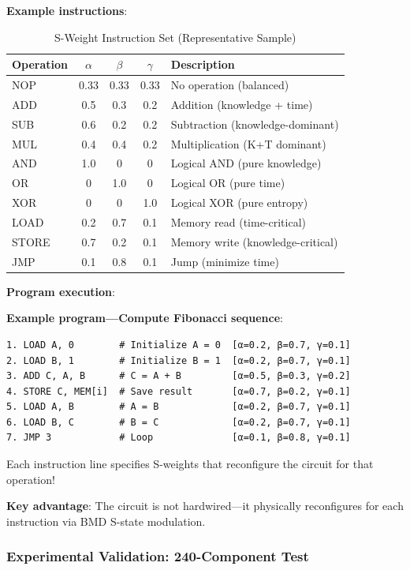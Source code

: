 \documentclass[11pt,a4paper]{article}
\begin{document}
\textbf{Example instructions}:

\begin{table}[H]
\centering
\caption{S-Weight Instruction Set (Representative Sample)}
\small
\begin{tabular}{lcccp{4.5cm}}
\toprule
\textbf{Operation} & \textbf{$\alpha$} & \textbf{$\beta$} & \textbf{$\gamma$} & \textbf{Description} \\
\midrule
NOP & 0.33 & 0.33 & 0.33 & No operation (balanced) \\
ADD & 0.5 & 0.3 & 0.2 & Addition (knowledge + time) \\
SUB & 0.6 & 0.2 & 0.2 & Subtraction (knowledge-dominant) \\
MUL & 0.4 & 0.4 & 0.2 & Multiplication (K+T dominant) \\
AND & 1.0 & 0 & 0 & Logical AND (pure knowledge) \\
OR & 0 & 1.0 & 0 & Logical OR (pure time) \\
XOR & 0 & 0 & 1.0 & Logical XOR (pure entropy) \\
LOAD & 0.2 & 0.7 & 0.1 & Memory read (time-critical) \\
STORE & 0.7 & 0.2 & 0.1 & Memory write (knowledge-critical) \\
JMP & 0.1 & 0.8 & 0.1 & Jump (minimize time) \\
\bottomrule
\end{tabular}
\end{table}

\textbf{Program execution}:

\textbf{Example program—Compute Fibonacci sequence}:

\begin{verbatim}
1. LOAD A, 0        # Initialize A = 0  [α=0.2, β=0.7, γ=0.1]
2. LOAD B, 1        # Initialize B = 1  [α=0.2, β=0.7, γ=0.1]
3. ADD C, A, B      # C = A + B         [α=0.5, β=0.3, γ=0.2]
4. STORE C, MEM[i]  # Save result       [α=0.7, β=0.2, γ=0.1]
5. LOAD A, B        # A = B             [α=0.2, β=0.7, γ=0.1]
6. LOAD B, C        # B = C             [α=0.2, β=0.7, γ=0.1]
7. JMP 3            # Loop              [α=0.1, β=0.8, γ=0.1]
\end{verbatim}

Each instruction line specifies S-weights that reconfigure the circuit for that operation!

\textbf{Key advantage}: The circuit is not hardwired—it physically reconfigures for each instruction via BMD S-state modulation.

\subsubsection{Experimental Validation: 240-Component Test}
\end{document}

